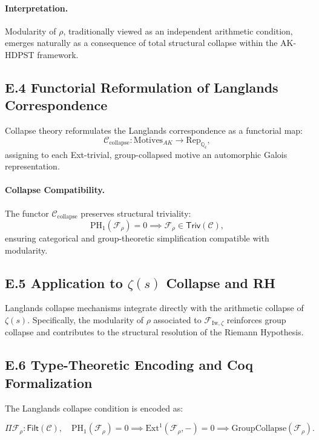 \documentclass[11pt]{article}
\begin{document}
\paragraph{Interpretation.}  
Modularity of $\rho$, traditionally viewed as an independent arithmetic condition, emerges naturally as a consequence of total structural collapse within the AK-HDPST framework.

\subsection*{E.4 Functorial Reformulation of Langlands Correspondence}

Collapse theory reformulates the Langlands correspondence as a functorial map:
\[
\mathcal{C}_{\mathrm{collapse}} : \mathrm{Motives}_{AK} \longrightarrow \mathrm{Rep}_{\mathbb{Q}_\ell},
\]
assigning to each Ext-trivial, group-collapsed motive an automorphic Galois representation.

\paragraph{Collapse Compatibility.}  
The functor $\mathcal{C}_{\mathrm{collapse}}$ preserves structural triviality:
\[
\mathrm{PH}_1(\mathcal{F}_\rho) = 0 \implies \mathcal{F}_\rho \in \mathsf{Triv}(\mathcal{C}),
\]
ensuring categorical and group-theoretic simplification compatible with modularity.

\subsection*{E.5 Application to $\zeta(s)$ Collapse and RH}

Langlands collapse mechanisms integrate directly with the arithmetic collapse of $\zeta(s)$. Specifically, the modularity of $\rho$ associated to $\mathcal{F}_{\mathrm{Iw}, \zeta}$ reinforces group collapse and contributes to the structural resolution of the Riemann Hypothesis.

\subsection*{E.6 Type-Theoretic Encoding and Coq Formalization}

The Langlands collapse condition is encoded as:

\[
\Pi \mathcal{F}_\rho : \mathsf{Filt}(\mathcal{C}), \quad 
\mathrm{PH}_1(\mathcal{F}_\rho) = 0 \implies 
\mathrm{Ext}^1(\mathcal{F}_\rho, -) = 0 \implies 
\mathrm{GroupCollapse}(\mathcal{F}_\rho).
\]
\end{document}
